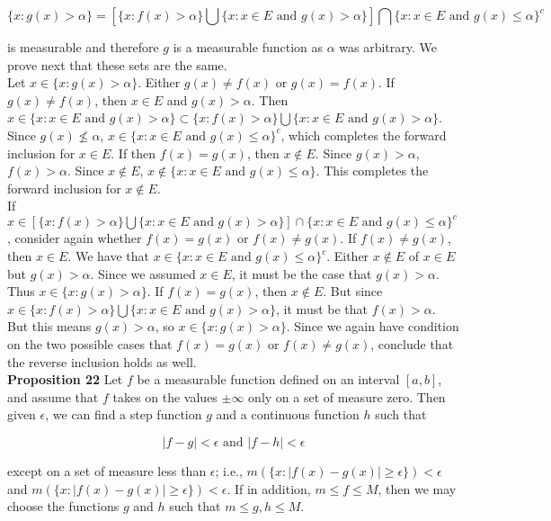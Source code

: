 \documentclass[a4paper]{article}
\begin{document}
$$\{x : g(x) > \alpha\} = \left[\{x : f(x) > \alpha\} \bigcup \{x: x \in E \text{ and } g(x) > \alpha \}\right] \bigcap \{x: x \in E \text{ and } g(x) \leq \alpha \}^c$$

is measurable and therefore $g$ is a measurable function as $\alpha$ was arbitrary. We prove next that these sets are the same.\\

Let $x \in \{x : g(x) > \alpha\}$. Either $g(x) \neq f(x)$ or $g(x) = f(x)$. If $g(x) \neq f(x)$, then $x \in E$ and $g(x) > \alpha$. Then $x \in \{x : x \in E \text{ and } g(x) > \alpha\} \subset \{x : f(x) > \alpha\} \bigcup \{x: x \in E \text{ and } g(x) > \alpha \}$. Since $g(x) \not\leq \alpha$, $x \in \{x: x \in E \text{ and } g(x) \leq \alpha\}^c$, which completes the forward inclusion for $x \in E$. If then $f(x) = g(x)$, then $x \not\in E$. Since $g(x) > \alpha$, $f(x) > \alpha$. Since $x\not\in E$, $x \not\in \{x : x \in E \text{ and } g(x) \leq \alpha\}$. This completes the forward inclusion for $x \not\in E$.\\

If $x \in \left[\{x : f(x) > \alpha\} \bigcup \{x: x \in E \text{ and } g(x) > \alpha \}\right] \cap \{x: x \in E \text{ and } g(x) \leq \alpha \}^c$, consider again whether $f(x) = g(x)$ or $f(x) \neq g(x)$. If $f(x) \neq g(x)$, then $x \in E$. We have that $x \in \{x : x \in E \text{ and } g(x) \leq \alpha\}^c$. Either $x \not\in E$ of $x \in E$ but $g(x) > \alpha$. Since we assumed $x \in E$, it must be the case that $g(x) > \alpha$. Thus $x \in \{x : g(x) > \alpha\}$. If $f(x) = g(x)$, then $x \not\in E$. But since $x \in \{x : f(x) > \alpha\} \bigcup \{x : x \in E \text{ and } g(x) > \alpha\}$, it must be that $f(x) > \alpha$. But this means $g(x) > \alpha$, so $x \in \{x  : g(x) > \alpha\}$. Since we again have condition on the two possible cases that $f(x) = g(x)$ or $f(x) \neq g(x)$, conclude that the reverse inclusion holds as well. \\

{\bf Proposition 22} Let $f$ be a measurable function defined on an interval $[a,b]$, and assume that $f$ takes on the values $\pm \infty$ only on a set of measure zero. Then given $\epsilon$, we can find a step function $g$ and a continuous function $h$ such that

$$|f-g| < \epsilon \text{ and } |f-h| < \epsilon $$

except on a set of measure less than $\epsilon$; i.e., $m(\{x : |f(x) - g(x)| \geq \epsilon \}) < \epsilon$ and $m(\{x : |f(x) - g(x)| \geq \epsilon \}) < \epsilon$. If in addition, $m \leq f \leq M$, then we may choose the functions $g$ and $h$ such that $m \leq g,h \leq M$. \\
\end{document}
